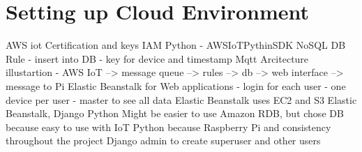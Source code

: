 \chapter{Setting up Cloud Environment}

AWS iot
Certification and keys IAM 
Python - AWSIoTPythinSDK 
NoSQL DB
Rule - insert into DB - key for device and timestamp
Mqtt
Arcitecture illustartion - AWS IoT --> message queue --> rules --> db --> web interface --> message to Pi
Elastic Beanstalk for Web applications - login for each user - one device per user - master to see all data
Elastic Beanstalk uses EC2 and S3
Elastic Beanstalk, Django Python
Might be easier to use Amazon RDB, but chose DB because easy to use with IoT
Python because Raspberry Pi and consistency throughout the project 
Django admin to create superuser and other users